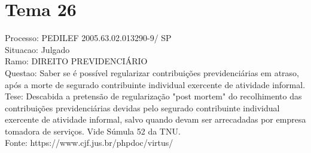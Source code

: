 \documentclass[12pt]{article}
\begin{document}
\section*{Tema 26}
Processo: PEDILEF 2005.63.02.013290-9/ SP\\
Situacao: Julgado\\
Ramo: DIREITO PREVIDENCIÁRIO\\
Questao: Saber se é possível regularizar contribuições previdenciárias em atraso, após a morte de segurado contribuinte individual exercente de atividade informal.\\
Tese: Descabida a pretensão de regularização "post mortem" do recolhimento das contribuições previdenciárias devidas pelo segurado contribuinte individual exercente de atividade informal, salvo quando devam ser arrecadadas por empresa tomadora de serviços. Vide Súmula 52 da TNU.\\
Fonte: https://www.cjf.jus.br/phpdoc/virtus/
\end{document}
